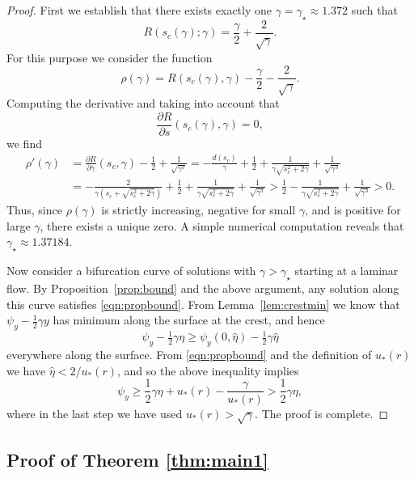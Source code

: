 \documentclass[pdflatex,sn-mathphys-num]{sn-jnl}%
\numberwithin{equation}{section}
\theoremstyle{thmstyleone}
\begin{document}
\begin{proof}
  First we establish that there exists exactly one $\gamma = \gamma_\star \approx 1.372$ such that
  \[
  R(s_c(\gamma); \gamma) = \frac{\gamma}{2} + \frac {2}{\sqrt{\gamma}}.
  \]
  For this purpose we consider the function
  \[
  \rho(\gamma) = R(s_c(\gamma), \gamma) - \frac{\gamma}{2} - \frac {2}{\sqrt{\gamma}}.
  \]
  Computing the derivative and taking into account that 
  \[
  \frac{\partial R}{\partial s}(s_c(\gamma), \gamma) = 0,
  \]
  we find
  \[
  \begin{split}
    \rho'(\gamma) & = \frac{\partial R}{\partial \gamma}(s_c, \gamma) - \frac12 + \frac{1}{\sqrt{\gamma^3}} = - \frac{d(s_c)}{\gamma}+\frac12 + \frac{1}{\gamma \sqrt{s_c^2+2\gamma}} + \frac{1}{\sqrt{\gamma^3}}  \\
    & = - \frac{2}{\gamma (s_c + \sqrt{s_c^2+2\gamma})}+\frac12 + \frac{1}{\gamma \sqrt{s_c^2+2\gamma}} + \frac{1}{\sqrt{\gamma^3}} > \frac12 -\frac{1}{\gamma \sqrt{s_c^2+2\gamma}} + \frac{1}{\sqrt{\gamma^3}} > 0.
  \end{split}
  \]
  Thus, since $\rho(\gamma)$ is strictly increasing, negative for small $\gamma$, and is positive for large $\gamma$, there exists a unique zero. A simple numerical computation reveals that $\gamma_\star \approx 1.37184$.
  
  Now consider a bifurcation curve of solutions with $\gamma > \gamma_\star$ starting at a laminar flow. By Proposition~\ref{prop:bound} and the above argument, any solution along this curve satisfies \eqref{eqn:propbound}. From Lemma~\ref{lem:crestmin} we know that $\psi_y - \tfrac12 \gamma y$ has minimum along the surface at the crest, and hence
  \[
  \psi_y - \tfrac12\gamma \eta \geq \psi_y(0,\hat{\eta}) - \tfrac12 \gamma\hat{\eta}
  \]
  everywhere along the surface. From \eqref{eqn:propbound} and the definition of $u_*(r)$ we have $\hat\eta < 2/u_*(r)$, and so the above inequality implies
  \[
    \psi_y \geq \frac12\gamma \eta + u_*(r) - \frac{\gamma}{u_*(r)} > \frac12\gamma \eta,
  \]
  where in the last step we have used $u_*(r) > \sqrt\gamma$. The proof is complete.
\end{proof}

\subsection{Proof of Theorem \ref{thm:main1}}
\end{document}
